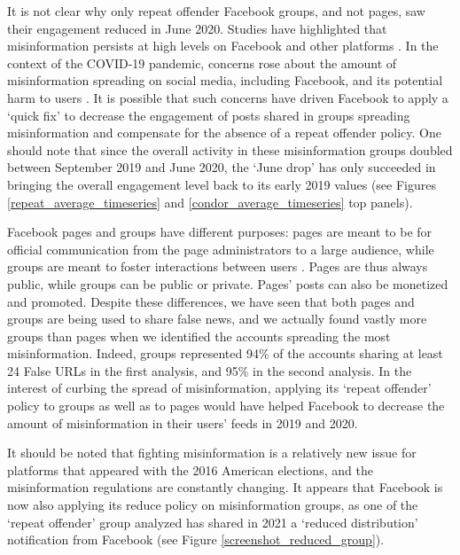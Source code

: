 \documentclass[review]{elsarticle}
\begin{document}
{{It is not clear why only repeat offender Facebook groups, and not pages, saw their engagement reduced in June 2020.
Studies have highlighted that misinformation persists at high levels on Facebook and other platforms \citep{kornbluh2020new, resnick2018iffy}.
In the context of the COVID-19 pandemic, concerns rose about the amount of misinformation spreading on social media, including Facebook, and its potential harm to users \citep{johnson2020online}.
It is possible that such concerns have driven Facebook to apply a `quick fix' to decrease the engagement of posts shared in groups spreading misinformation and compensate for the absence of a repeat offender policy.
One should note that since the overall activity in these misinformation groups doubled between September 2019 and June 2020, the `June drop' has only succeeded in bringing the overall engagement level back to its early 2019 values (see Figures \ref{repeat_average_timeseries} and \ref{condor_average_timeseries} top panels).

Facebook pages and groups have different purposes: pages are meant to be for official communication from the page administrators to a large audience, while groups are meant to foster interactions between users \citep{differenceGroupAndPage}. 
Pages are thus always public, while groups can be public or private.
Pages' posts can also be monetized and promoted.
Despite these differences, we have seen that both pages and groups are being used to share false news, and we actually found vastly more groups than pages when we identified the accounts spreading the most misinformation.
Indeed, groups represented 94\% of the accounts sharing at least 24 False URLs in the first analysis, and 95\% in the second analysis.
In the interest of curbing the spread of misinformation, applying its `repeat offender' policy to groups as well as to pages would have helped Facebook to decrease the amount of misinformation in their users’ feeds in 2019 and 2020.

It should be noted that fighting misinformation is a relatively new issue for platforms that appeared with the 2016 American elections, and the misinformation regulations are constantly changing.
It appears that Facebook is now also applying its reduce policy on misinformation groups, as one of the `repeat offender' group analyzed has shared in 2021 a `reduced distribution' notification from Facebook (see Figure \ref{screenshot_reduced_group}).

}}
\end{document}
